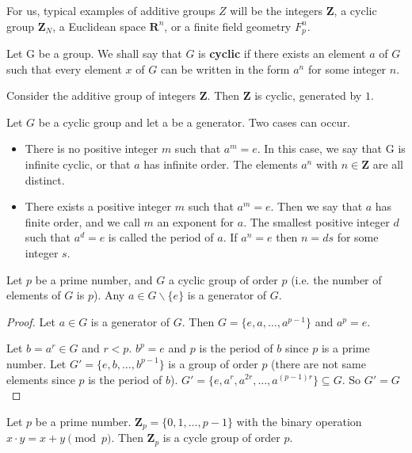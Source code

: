 For us, typical examples of additive groups $Z$ will be the integers $\mathbf{Z}$, a cyclic
group $\mathbf{Z}_N$, a Euclidean space $\mathbf{R}^n$, or a finite field geometry $F^n_p$. 



\begin{defn}
    Let G be a group. We shall say that $G$ is \textbf{cyclic} if there exists an element $a$ of $G$ such that every element $x$ of $G$ can be written in the form $a^n$ for some integer $n$. 
\end{defn}
\begin{exm}
     Consider the additive group of integers $\mathbf{Z}$. Then $\mathbf{Z}$ is cyclic, generated by $1$.
\end{exm}
Let $G$ be a cyclic group 
and let a be a generator. Two cases can occur. 
\begin{itemize}
    \item There is no positive integer $m$ such that $a^m=e$. In this case, we say that G is infinite cyclic, or that $a$ has infinite order. The elements $a^n$ with $n \in \mathbf{Z}$ are all distinct. 
    \item There exists a positive integer $m$ such that $a^m=e$. Then we say that $a$ has finite order, and we call $m$ an exponent for $a$. The smallest positive integer $d$ such that $a^d = e$ is called the period of $a$. If $a^n=e$ then $n = ds$ for some integer $s$. 
\end{itemize}
\begin{lem}
    Let $p$ be a prime number, and $G$ a cyclic group of order $p$ (i.e. the number of elements of $G$ is $p$). Any $a\in G\backslash\{e\}$ is a generator of $G$.
\end{lem}
\begin{proof}
    Let $a\in G$ is a generator of $G$. Then $G=\{e,a,\ldots,a^{p-1}\}$ and $a^p=e$.

    Let $b = a^r\in G$ and $r<p$. $b^p = e$ and $p$ is the period of $b$ since $p$ is a prime number. Let $G'=\{e,b,\ldots,b^{p-1}\}$ is a group of order $p$ (there are not same elements since $p$ is the period of $b$). $G'=\{e,a^r,a^{2r},\ldots,a^{(p-1)r}\}\subseteq G$. So $G'=G$
\end{proof}
\begin{exm}
    Let $p$ be a prime number. $\mathbf{Z}_p = \{0,1,\ldots,p-1\}$ with the binary operation $x\cdot y = x+y\pmod p$. Then $\mathbf{Z}_p$ is a cycle group of order $p$.
\end{exm}

